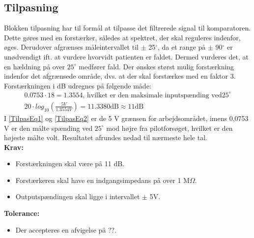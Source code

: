 \subsection{Tilpasning} 
Blokken tilpasning har til formål at tilpasse det filtrerede signal til komparatoren. Dette gøres med en forstærker, således at spektret, der skal reguleres indenfor, øges. Derudover afgrænses måleintervallet til $\pm$ 25$^{\circ}$, da et range på $\pm$ 90$^{\circ}$ er unødvendigt ift. at vurdere hvorvidt patienten er faldet. Dermed vurderes det, at en hældning på over $25^{\circ}$ medfører fald. Der ønskes størst mulig forstærkning indenfor det afgrænsede område, dvs. at der skal forstærkes med en faktor 3.  Forstærkningen i dB udregnes på følgende måde:
\begin{align}\label{TilpasEq1}
0.0753 \cdot 18 = 1.3554\text{, hvilket er den maksimale inputspænding ved} 25^{\circ} \\
\label{TilpasEq2} 20 \cdot log_{10} (\frac{5 V}{1.3554 V}) = 11.3380 \text{dB} \approx 11 \text{dB}
\end{align} 
I \eqref{TilpasEq1} og \eqref{TilpasEq2} er de 5 V grænsen for arbejdsområdet, imens 0,0753 V er den målte spænding ved $25^{\circ}$ mod højre fra pilotforsøget, hvilket er den højeste målte volt. Resultatet afrundes nedad til nærmeste hele tal. \\

\noindent\textbf{Krav:}
\begin{itemize}
	\item Forstærkningen skal være på 11 dB.
	\item Forstærkeren skal have en indgangsimpedans på over 1 M$\Omega$. 
	\item Outputspændingen skal ligge i intervallet $\pm$ 5V.
\end{itemize}
\textbf{Tolerance:}
\begin{itemize}
	\item Der accepteres en afvigelse på ??.
\end{itemize}
